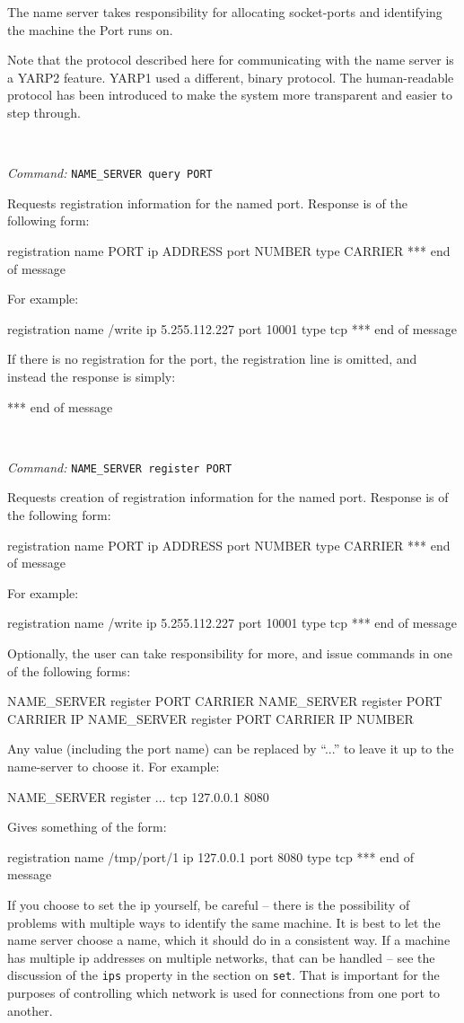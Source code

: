 \documentclass[a4]{article}
\newenvironment{packed_itemize}{
\begin{itemize}
  \renewcommand{\labelitemi}{$\triangleright$}
  \setlength{\itemsep}{1pt}
  \setlength{\parskip}{0pt}
  \setlength{\parsep}{0pt}
}{\end{itemize}}
\newcommand{\newusage}{\ \\\noindent\makebox[\textwidth]{\hrulefill}}
\newcommand{\usage}[1]{ \begin{packed_itemize} \item {\it Command:} {\tt #1} \end{packed_itemize}}
\begin{document}
The name server takes responsibility for allocating
socket-ports and identifying the machine the Port runs on.

Note that the protocol described here for communicating with the name
server is a YARP2 feature.  YARP1 used a different, binary protocol.
The human-readable protocol has been introduced to make the system
more transparent and easier to step through.




\newusage{}
\usage{NAME\_SERVER query PORT}
Requests registration information for the named port.  Response is of 
the following form:
\begin{code}
registration name PORT ip ADDRESS port NUMBER type CARRIER
*** end of message
\end{code}
For example:
\begin{code}
registration name /write ip 5.255.112.227 port 10001 type tcp
*** end of message
\end{code}
If there is no registration for the port, the registration line
is omitted, and instead the response is simply:
\begin{code}
*** end of message
\end{code}


\newusage{}
\usage{NAME\_SERVER register PORT}

Requests creation of registration information for the named port.  
Response is of the following form:
\begin{code}
registration name PORT ip ADDRESS port NUMBER type CARRIER
*** end of message
\end{code}
For example:
\begin{code}
registration name /write ip 5.255.112.227 port 10001 type tcp
*** end of message
\end{code}
%
Optionally, the user can take responsibility for more, and 
issue commands in one of the following forms:
\begin{code}
NAME_SERVER register PORT CARRIER
NAME_SERVER register PORT CARRIER IP
NAME_SERVER register PORT CARRIER IP NUMBER
\end{code}
Any value (including the port name) can be replaced by ``...'' to leave it 
up to the name-server to choose it.  For example:
\begin{code}
NAME_SERVER register ... tcp 127.0.0.1 8080
\end{code}
Gives something of the form:
\begin{code}
registration name /tmp/port/1 ip 127.0.0.1 port 8080 type tcp
*** end of message
\end{code}
If you choose to set the ip yourself, be careful -- there is the 
possibility of problems with multiple ways to identify the same
machine.  It is best to let the name server choose a name,
which it should do in a consistent way.  If a machine has
multiple ip addresses on multiple networks, that can be 
handled -- see the 
discussion of the {\tt ips} property in the section on {\tt set}.
That is important for the purposes of controlling which 
network is used for connections from one port to another.
\end{document}

